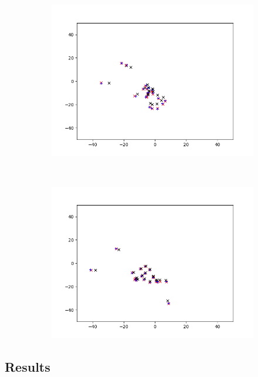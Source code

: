 \begin{figure}[h] %
\centering
\begin{subfigure}[t]{0.45\textwidth}
\centering
\includegraphics[width=\textwidth]{Figs/layers-136-161}
\caption{} 
\label{fig:layers-136-161} 
\end{subfigure}
~
\begin{subfigure}[t]{0.45\textwidth}
\includegraphics[width=\textwidth]{Figs/layers-686-736}
\caption{} 
\label{fig:layers-686-736}
\end{subfigure}
\end{figure}


\subsection{Results}

